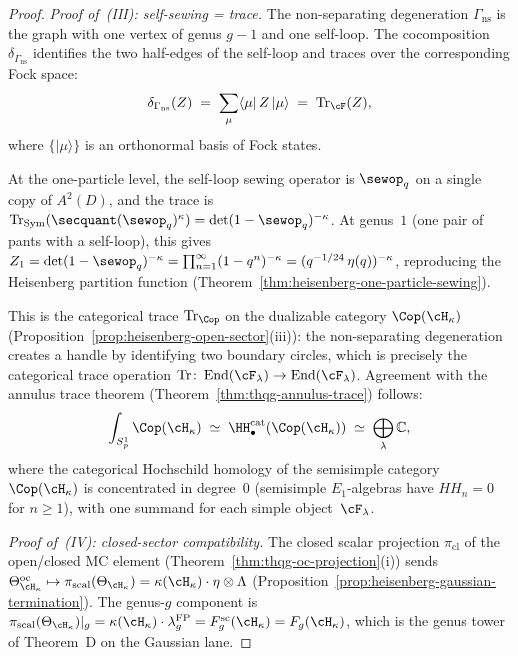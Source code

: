 \begin{proof}
\medskip\noindent
\textit{Proof of~\textup{(III)}: self-sewing = trace.}
The non-separating degeneration $\Gamma_{\mathrm{ns}}$ is the graph
with one vertex of genus $g-1$ and one self-loop. The cocomposition
$\delta_{\Gamma_{\mathrm{ns}}}$ identifies the two half-edges of the
self-loop and traces over the corresponding Fock space:
\[
\delta_{\Gamma_{\mathrm{ns}}}(Z)
\;=\;
\sum_{\mu}
\langle\mu|\, Z\, |\mu\rangle
\;=\;
\operatorname{Tr}_{\cF}(Z),
\]
where $\{|\mu\rangle\}$ is an orthonormal basis of Fock states.

At the one-particle level, the self-loop sewing operator is
$\sewop_q$ on a single copy of $A^2(D)$, and the trace is
$\operatorname{Tr}_{\mathrm{Sym}}(\secquant(\sewop_q)^\kappa)
= \det(1 - \sewop_q)^{-\kappa}$. At genus~$1$
(one pair of pants with a self-loop), this gives
$Z_1 = \det(1 - \sewop_q)^{-\kappa}
= \prod_{n=1}^\infty (1 - q^n)^{-\kappa}
= (q^{-1/24}\,\eta(q))^{-\kappa}$,
reproducing the Heisenberg partition function
(Theorem~\ref{thm:heisenberg-one-particle-sewing}).

This is the categorical trace $\operatorname{Tr}_{\Cop}$ on the
dualizable category $\Cop(\cH_\kappa)$
(Proposition~\ref{prop:heisenberg-open-sector}(iii)): the
non-separating degeneration creates a handle by identifying two
boundary circles, which is precisely the categorical trace
operation $\operatorname{Tr}\colon \operatorname{End}(\cF_\lambda)
\to \operatorname{End}(\cF_\lambda)$. Agreement with the annulus
trace theorem (Theorem~\ref{thm:thqg-annulus-trace}) follows:
\begin{equation}\label{eq:heisenberg-annulus-trace-agreement}
\int_{S^1_p} \Cop(\cH_\kappa)
\;\simeq\;
\HH^{\mathrm{cat}}_\bullet(\Cop(\cH_\kappa))
\;\simeq\;
\bigoplus_\lambda \mathbb{C},
\end{equation}
where the categorical Hochschild homology of the semisimple category
$\Cop(\cH_\kappa)$ is concentrated in degree~$0$ (semisimple
$E_1$-algebras have $HH_n = 0$ for $n \geq 1$), with one summand
for each simple object~$\cF_\lambda$.

\medskip\noindent
\textit{Proof of~\textup{(IV)}: closed-sector compatibility.}
The closed scalar projection $\pi_{\mathrm{cl}}$ of the open/closed MC
element (Theorem~\ref{thm:thqg-oc-projection}(i)) sends
$\Theta^{\mathrm{oc}}_{\cH_\kappa} \mapsto
\pi_{\mathrm{scal}}(\Theta_{\cH_\kappa})
= \kappa(\cH_\kappa) \cdot \eta \otimes \Lambda$
(Proposition~\ref{prop:heisenberg-gaussian-termination}). The
genus-$g$ component is
$\pi_{\mathrm{scal}}(\Theta_{\cH_\kappa})|_g
= \kappa(\cH_\kappa) \cdot \lambda_g^{\mathrm{FP}}
 = F_g^{\mathrm{sc}}(\cH_\kappa)
 = F_g(\cH_\kappa)$, which is the genus tower of Theorem~D on the
Gaussian lane.


\end{proof}
